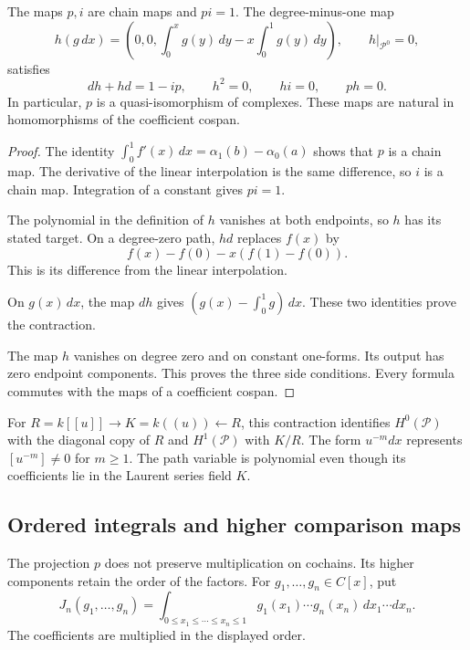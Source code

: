 \begin{samepage}
\begin{lemma}\label{ogd:lem:path-contraction}
The maps \(p,i\) are chain maps and \(pi=1\).
The degree-minus-one map
\[
 h(g\,dx)=
 \left(0,0,\int_0^x g(y)\,dy-x\int_0^1g(y)\,dy\right),
 \qquad h|_{\mathcal P^0}=0,
\]
satisfies
\[
 dh+hd=1-ip,\qquad h^2=0,\qquad hi=0,\qquad ph=0.
\]
In particular, \(p\) is a quasi-isomorphism of complexes.
These maps are natural in homomorphisms of the coefficient cospan.
\end{lemma}
\end{samepage}

\begin{proof}
The identity
\(\int_0^1f'(x)\,dx=\alpha_1(b)-\alpha_0(a)\)
shows that \(p\) is a chain map.
The derivative of the linear interpolation is the same difference,
so \(i\) is a chain map.
Integration of a constant gives \(pi=1\).

The polynomial in the definition of \(h\) vanishes at both endpoints,
so \(h\) has its stated target.
On a degree-zero path, \(hd\) replaces \(f(x)\) by
\[
 f(x)-f(0)-x(f(1)-f(0)).
\]
This is its difference from the linear interpolation.

On \(g(x)\,dx\), the map \(dh\) gives
\((g(x)-\int_0^1g)\,dx\).
These two identities prove the contraction.

The map \(h\) vanishes on degree zero and on constant one-forms.
Its output has zero endpoint components.
This proves the three side conditions.
Every formula commutes with the maps of a coefficient cospan.
\end{proof}

For \(R=k[[u]]\to K=k((u))\leftarrow R\), this contraction identifies
\(H^0(\mathcal P)\) with the diagonal copy of \(R\) and
\(H^1(\mathcal P)\) with \(K/R\).
The form \(u^{-m}dx\) represents \([u^{-m}]\ne0\) for \(m\geq1\).
The path variable is polynomial even though its coefficients lie in
the Laurent series field \(K\).

\subsection{Ordered integrals and higher comparison maps}
\label{ogd:sec:path-higher-maps}

The projection \(p\) does not preserve multiplication on cochains.
Its higher components retain the order of the factors.
For \(g_1,\ldots,g_n\in C[x]\), put
\begin{equation}\label{ogd:eq:path-ordered-integral}
 J_n(g_1,\ldots,g_n)=
 \int_{0\leq x_1\leq\cdots\leq x_n\leq1}
 g_1(x_1)\cdots g_n(x_n)\,dx_1\cdots dx_n .
\end{equation}
The coefficients are multiplied in the displayed order.

